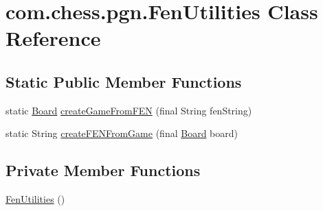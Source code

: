 \hypertarget{classcom_1_1chess_1_1pgn_1_1_fen_utilities}{}\section{com.\+chess.\+pgn.\+Fen\+Utilities Class Reference}
\label{classcom_1_1chess_1_1pgn_1_1_fen_utilities}
\subsection*{Static Public Member Functions}
\begin{DoxyCompactItemize}
\item 
static \mbox{\hyperlink{classcom_1_1chess_1_1engine_1_1classic_1_1board_1_1_board}{Board}} \mbox{\hyperlink{classcom_1_1chess_1_1pgn_1_1_fen_utilities_afbf8cd13d7769f998f599cb6698377c7}{create\+Game\+From\+F\+EN}} (final String fen\+String)
\item 
static String \mbox{\hyperlink{classcom_1_1chess_1_1pgn_1_1_fen_utilities_a2e34ed19fd0427da5ff132ea2bc96913}{create\+F\+E\+N\+From\+Game}} (final \mbox{\hyperlink{classcom_1_1chess_1_1engine_1_1classic_1_1board_1_1_board}{Board}} board)
\end{DoxyCompactItemize}
\subsection*{Private Member Functions}
\begin{DoxyCompactItemize}
\item 
\mbox{\hyperlink{classcom_1_1chess_1_1pgn_1_1_fen_utilities_a500f5de0350946605fb139958d650255}{Fen\+Utilities}} ()
\end{DoxyCompactItemize}

